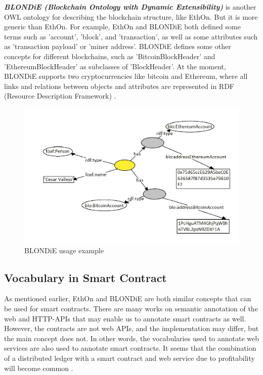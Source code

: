 \begin{center}
\begin{figure}[htb!]
		
	\end{figure}
	
\end{center}
\textbf{\textit{BLONDiE (Blockchain Ontology with Dynamic Extensibility)}} is another OWL ontology for describing the blockchain structure, like EthOn. But it is more generic than EthOn. For example, EthOn and BLONDiE both defined some terms such as 'account', 'block', and 'transaction', as well as some attributes such as 'transaction payload' or 'miner address'. BLONDiE defines some other concepts for different blockchains, such as 'BitcoinBlockHeader' and 'EthereumBlockHeader' as subclasses of 'BlockHeader'. At the moment, BLONDiE supports two cryptocurrencies like bitcoin and Ethereum, where all links and relations between objects and attributes are represented in RDF (Resource Description Framework) \cite{Third}.
\begin{center}
	\begin{figure}[htb!]
		
		\begin{minipage}{0.55\linewidth}
			\centering
			\includegraphics[width=1.75\textwidth]{images/chap02_BLONDiE.png}
		\end{minipage}
		\caption[BLONDiE]{BLONDiE usage example \cite{Hector}}
		
		
	\end{figure}
	
\end{center}
\subsection{Vocabulary in Smart Contract}
As mentioned earlier, EthOn and BLONDiE are both similar concepts that can be used for smart contracts. There are many works on semantic annotation of the web and HTTP-APIs that may enable us to annotate smart contracts as well. However, the contracts are not web APIs, and the implementation may differ, but the main concept does not. In other words, the vocabularies used to annotate web services are also used to annotate smart contracts. It seems that the combination of a distributed ledger with a smart contract and web service due to profitability will become common \cite{Third}.

